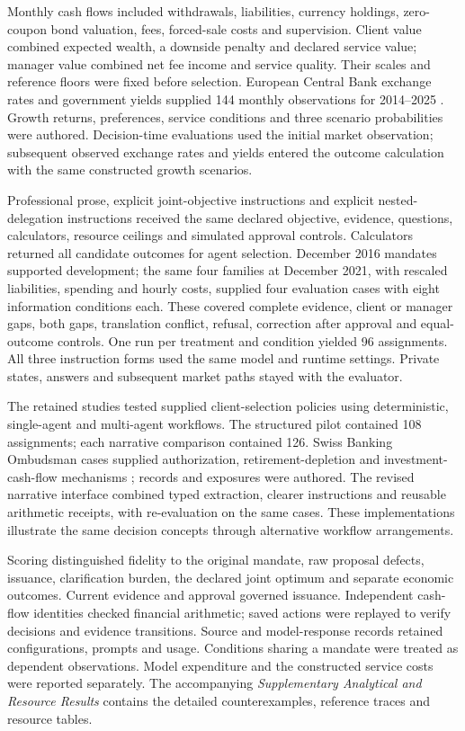 \documentclass[oneside,10pt,english]{swissi}
\begin{document}
Monthly cash flows included withdrawals, liabilities, currency holdings, zero-coupon bond valuation, fees, forced-sale costs and supervision. Client value combined expected wealth, a downside penalty and declared service value; manager value combined net fee income and service quality. Their scales and reference floors were fixed before selection. European Central Bank exchange rates and government yields supplied 144 monthly observations for 2014--2025 \parencite{ecb2026chfeur,ecb2026yieldcurves}. Growth returns, preferences, service conditions and three scenario probabilities were authored. Decision-time evaluations used the initial market observation; subsequent observed exchange rates and yields entered the outcome calculation with the same constructed growth scenarios.

Professional prose, explicit joint-objective instructions and explicit nested-delegation instructions received the same declared objective, evidence, questions, calculators, resource ceilings and simulated approval controls. Calculators returned all candidate outcomes for agent selection. December 2016 mandates supported development; the same four families at December 2021, with rescaled liabilities, spending and hourly costs, supplied four evaluation cases with eight information conditions each. These covered complete evidence, client or manager gaps, both gaps, translation conflict, refusal, correction after approval and equal-outcome controls. One run per treatment and condition yielded 96 assignments. All three instruction forms used the same model and runtime settings. Private states, answers and subsequent market paths stayed with the evaluator.

The retained studies tested supplied client-selection policies using deterministic, single-agent and multi-agent workflows. The structured pilot contained 108 assignments; each narrative comparison contained 126. Swiss Banking Ombudsman cases supplied authorization, retirement-depletion and investment-cash-flow mechanisms \parencite{ombudsman2023orders,ombudsman2020advice,ombudsman2019fund}; records and exposures were authored. The revised narrative interface combined typed extraction, clearer instructions and reusable arithmetic receipts, with re-evaluation on the same cases. These implementations illustrate the same decision concepts through alternative workflow arrangements.

Scoring distinguished fidelity to the original mandate, raw proposal defects, issuance, clarification burden, the declared joint optimum and separate economic outcomes. Current evidence and approval governed issuance. Independent cash-flow identities checked financial arithmetic; saved actions were replayed to verify decisions and evidence transitions. Source and model-response records retained configurations, prompts and usage. Conditions sharing a mandate were treated as dependent observations. Model expenditure and the constructed service costs were reported separately. The accompanying \emph{Supplementary Analytical and Resource Results} contains the detailed counterexamples, reference traces and resource tables.
\end{document}
